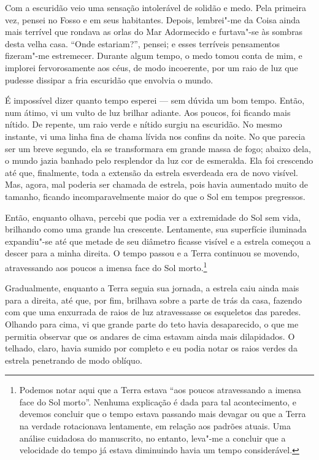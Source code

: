 Com a escuridão veio uma sensação intolerável de solidão e medo. Pela primeira vez, pensei no Fosso e em seus
habitantes. Depois, lembrei"-me da Coisa ainda mais terrível que rondava as orlas do Mar Adormecido e furtava"-se às
sombras desta velha casa. ``Onde estariam?'', pensei; e esses terríveis pensamentos fizeram"-me estremecer. Durante algum
tempo, o medo tomou conta de mim, e implorei fervorosamente aos céus, de modo incoerente, por um raio de luz que
pudesse dissipar a fria escuridão que envolvia o mundo.

É impossível dizer quanto tempo esperei --- sem dúvida um bom tempo. Então, num átimo, vi um vulto de luz brilhar
adiante. Aos poucos, foi ficando mais nítido. De repente, um raio verde e nítido surgiu na escuridão. No mesmo
instante, vi uma linha fina de chama lívida nos confins da noite. No que parecia ser um breve segundo, ela se
transformara em grande massa de fogo; abaixo dela, o mundo jazia banhado pelo resplendor da luz cor de esmeralda.
Ela foi crescendo até que, finalmente, toda a extensão da estrela esverdeada era de novo visível. Mas, agora, mal
poderia ser chamada de estrela, pois havia aumentado muito de tamanho, ficando incomparavelmente maior do que o
Sol em tempos pregressos.

Então, enquanto olhava, percebi que podia ver a extremidade do Sol sem vida, brilhando como uma grande lua crescente.
Lentamente, sua superfície iluminada expandiu"-se até que metade de seu diâmetro ficasse visível e a estrela começou a
descer para a minha direita. O tempo passou e a Terra continuou se movendo, atravessando aos poucos a imensa face do
Sol morto.\footnote{ Podemos notar aqui que a Terra estava “aos poucos atravessando a imensa face do Sol morto”. Nenhuma explicação é
dada para tal acontecimento, e devemos concluir que o tempo estava passando mais devagar ou que a Terra na verdade
rotacionava lentamente, em relação aos padrões atuais. Uma análise cuidadosa do manuscrito, no entanto, leva"-me a
concluir que a velocidade do tempo já estava diminuindo havia um tempo considerável.}

Gradualmente, enquanto a Terra seguia sua jornada, a estrela caiu ainda mais para a direita, até que, por fim,
brilhava sobre a parte de trás da casa, fazendo com que uma enxurrada de raios de luz atravessasse os esqueletos das
paredes. Olhando para cima, vi que grande parte do teto havia desaparecido, o que me permitia observar que os andares de
cima estavam ainda mais dilapidados. O telhado, claro, havia sumido por completo e eu podia notar os raios
verdes da estrela penetrando de modo oblíquo. 


